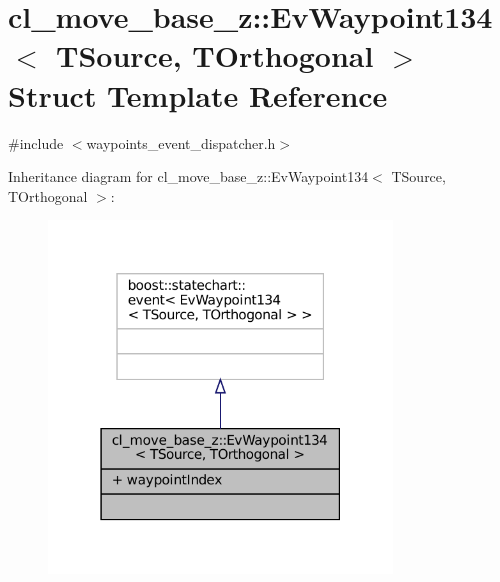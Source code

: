 \hypertarget{structcl__move__base__z_1_1EvWaypoint134}{}\section{cl\+\_\+move\+\_\+base\+\_\+z\+:\+:Ev\+Waypoint134$<$ T\+Source, T\+Orthogonal $>$ Struct Template Reference}
\label{structcl__move__base__z_1_1EvWaypoint134}


{\ttfamily \#include $<$waypoints\+\_\+event\+\_\+dispatcher.\+h$>$}



Inheritance diagram for cl\+\_\+move\+\_\+base\+\_\+z\+:\+:Ev\+Waypoint134$<$ T\+Source, T\+Orthogonal $>$\+:
\nopagebreak
\begin{figure}[H]
\begin{center}
\leavevmode
\includegraphics[width=259pt]{structcl__move__base__z_1_1EvWaypoint134__inherit__graph}
\end{center}
\end{figure}


